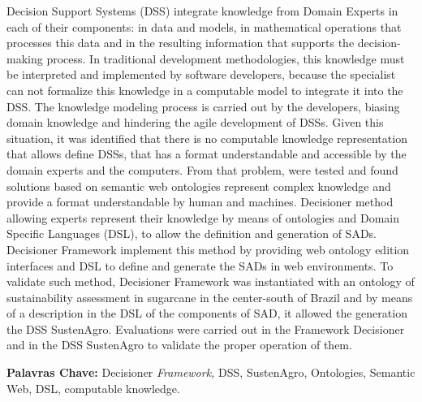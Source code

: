 Decision Support Systems (DSS) integrate knowledge from Domain Experts
in each of their components: in data and models, in mathematical operations
that processes this data and in the resulting information that supports
the decision-making process. In traditional development methodologies,
this knowledge must be interpreted and implemented by software developers,
because the specialist can not formalize this knowledge in a computable
model to integrate it into the DSS. The knowledge modeling process
is carried out by the developers, biasing domain knowledge and hindering
the agile development of DSSs. Given this situation, it was identified
that there is no computable knowledge representation that allows define
DSSs, that has a format understandable and accessible by the domain
experts and the computers. From that problem, were tested and found
solutions based on semantic web ontologies represent complex knowledge
and provide a format understandable by human and machines. Decisioner
method allowing experts represent their knowledge by means of ontologies
and Domain Specific Languages (DSL), to allow the definition and generation
of SADs. Decisioner Framework implement this method by providing web
ontology edition interfaces and DSL to define and generate the SADs
in web environments. To validate such method, Decisioner Framework
was instantiated with an ontology of sustainability assessment in
sugarcane in the center-south of Brazil and by means of a description
in the DSL of the components of SAD, it allowed the generation the
DSS SustenAgro. Evaluations were carried out in the Framework Decisioner
and in the DSS SustenAgro to validate the proper operation of them.

%
\textbf{Palavras Chave:} \foreignlanguage{english}{Decisioner \emph{Framework,
}DSS, SustenAgro, Ontologies, Semantic Web, DSL, computable knowledge.}%

